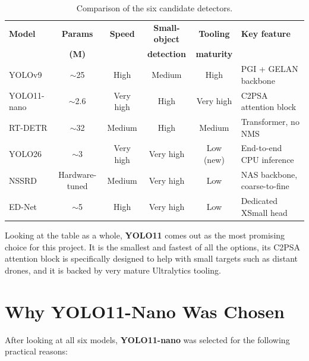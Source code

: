 \documentclass[12pt,a4paper]{report}
\begin{document}
\begin{table}[H]
\centering
\caption{Comparison of the six candidate detectors.}
\label{tab:model-compare}
\small
\setlength{\tabcolsep}{4pt}
\begin{tabular}{lccccl}
\toprule
\textbf{Model} & \textbf{Params} & \textbf{Speed} & \textbf{Small-object} & \textbf{Tooling} & \textbf{Key feature} \\
               & \textbf{(M)}    &                & \textbf{detection}    & \textbf{maturity} &                       \\
\midrule
YOLOv9         & $\sim$25   & High      & Medium     & High        & PGI + GELAN backbone \\
YOLO11-nano    & $\sim$2.6  & Very high & High       & Very high   & C2PSA attention block \\
RT-DETR        & $\sim$32   & Medium    & High       & Medium      & Transformer, no NMS \\
YOLO26         & $\sim$3    & Very high & Very high  & Low (new)   & End-to-end CPU inference \\
NSSRD          & Hardware-tuned & Medium & Very high  & Low         & NAS backbone, coarse-to-fine \\
ED-Net         & $\sim$5    & High      & Very high  & Low         & Dedicated XSmall head \\
\bottomrule
\end{tabular}
\end{table}

Looking at the table as a whole, \textbf{YOLO11} comes out as the most
promising choice for this project. It is the smallest and fastest of all the
options, its C2PSA attention block is specifically designed to help with small
targets such as distant drones, and it is backed by very mature Ultralytics
tooling.

\section{Why YOLO11-Nano Was Chosen}
After looking at all six models, \textbf{YOLO11-nano} was selected for the
following practical reasons:
\end{document}
